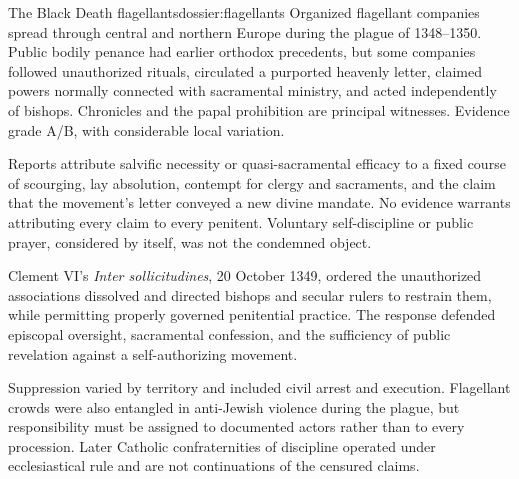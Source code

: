 \begin{heresydossier}{The Black Death flagellants}{dossier:flagellants}
\objectfield Organized flagellant companies spread through central and northern Europe during the plague of 1348--1350. Public bodily penance had earlier orthodox precedents, but some companies followed unauthorized rituals, circulated a purported heavenly letter, claimed powers normally connected with sacramental ministry, and acted independently of bishops. Chronicles and the papal prohibition are principal witnesses. Evidence grade A/B, with considerable local variation.

\propositionfield Reports attribute salvific necessity or quasi-sacramental efficacy to a fixed course of scourging, lay absolution, contempt for clergy and sacraments, and the claim that the movement's letter conveyed a new divine mandate. No evidence warrants attributing every claim to every penitent. Voluntary self-discipline or public prayer, considered by itself, was not the condemned object.

\responsefield Clement VI's \emph{Inter sollicitudines}, 20 October 1349, ordered the unauthorized associations dissolved and directed bishops and secular rulers to restrain them, while permitting properly governed penitential practice. The response defended episcopal oversight, sacramental confession, and the sufficiency of public revelation against a self-authorizing movement.

\aftermathfield Suppression varied by territory and included civil arrest and execution. Flagellant crowds were also entangled in anti-Jewish violence during the plague, but responsibility must be assigned to documented actors rather than to every procession. Later Catholic confraternities of discipline operated under ecclesiastical rule and are not continuations of the censured claims.
\end{heresydossier}


